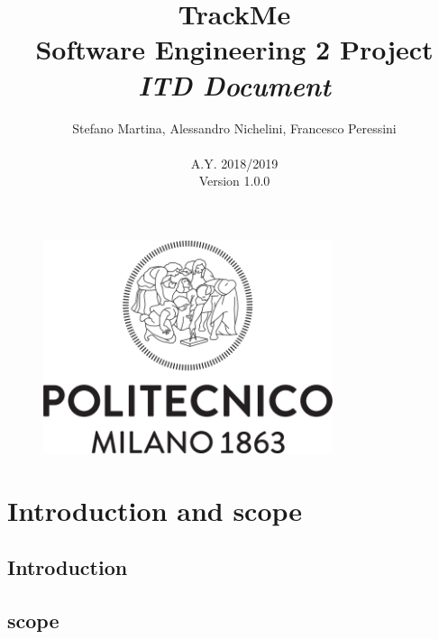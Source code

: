 \documentclass{article}
\begin{document}
\begin{figure}[t]
\centering
	\includegraphics[height=6.25cm,keepaspectratio]{Figures/logo}
\end{figure}

\title{TrackMe \\ Software Engineering 2 Project\\ \textit{ITD Document} }
\author{Stefano Martina, Alessandro Nichelini, Francesco Peressini
		\\ \\ A.Y. 2018/2019 \\ Version 1.0.0}
		
\maketitle
\newpage

\tableofcontents
\newpage

\section{Introduction and scope}
\subsection{Introduction}
\subsection{scope}
\end{document}
